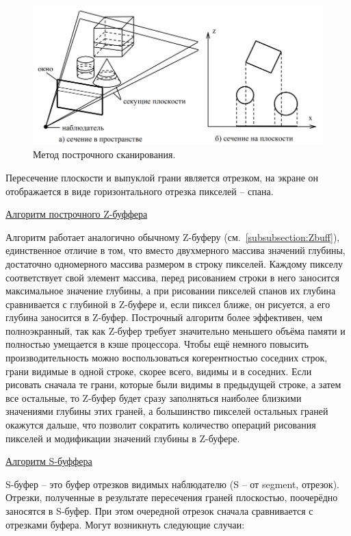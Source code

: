 \begin{figure}[H]
    \centering
    \includegraphics[width=\textwidth]{img/string_algorithms_1.png}
    \caption{Метод построчного сканирования.}
    \label{fig:string_algorithms_1}
\end{figure}

Пересечение плоскости и выпуклой грани является отрезком, на экране он отображается в виде горизонтального отрезка пикселей -- спана.~\cite{polski}


\underline{Алгоритм построчного Z-буффера}

\hspace{1.25cm}
Алгоритм работает аналогично обычному Z-буферу (см.~\autoref{subsubsection:Zbuff}),
единственное отличие в том, что вместо двухмерного массива значений
глубины, достаточно одномерного массива размером в строку пикселей.
Каждому пикселу соответствует свой элемент массива, перед рисованием
строки в него заносится максимальное значение глубины, а при рисовании
пикселей спанов их глубина сравнивается с глубиной в Z-буфере и, если
пиксел ближе, он рисуется, а его глубина заносится в Z-буфер. Построчный алгоритм более эффективен, чем полноэкранный, так как Z-буфер требует значительно меньшего объёма памяти и полностью умещается в кэше процессора. Чтобы ещё немного повысить производительность можно воспользоваться когерентностью соседних строк, грани видимые в одной строке, скорее всего, видимы и в соседних. Если рисовать сначала те
грани, которые были видимы в предыдущей строке, а затем все остальные,
то Z-буфер будет сразу заполняться наиболее близкими значениями глубины этих граней, а большинство пикселей остальных граней окажутся
дальше, что позволит сократить количество операций рисования пикселей
и модификации значений глубины в Z-буфере.~\cite{polski}


\underline{Алгоритм S-буффера}

\hspace{1.25cm}
S-буфер -- это буфер отрезков видимых наблюдателю (S -- от segment,
отрезок). Отрезки, полученные в результате пересечения граней плоскостью, поочерёдно заносятся в S-буфер. При этом очередной отрезок сначала сравнивается с отрезками буфера. Могут возникнуть следующие случаи:

